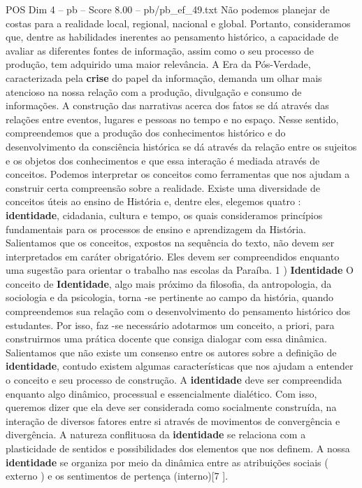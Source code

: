 \begin{textsample}{POS Dim 4 – pb – Score 8.00 – pb/pb\_ef\_49.txt}
Não podemos planejar de costas para a realidade local, regional, nacional e global.
Portanto, consideramos que, dentre as habilidades inerentes ao pensamento histórico, a capacidade de avaliar as diferentes fontes de informação, assim como o seu processo de produção, tem adquirido uma maior relevância.
A Era da Pós-Verdade, caracterizada pela \textbf{crise} do papel da informação, demanda um olhar mais atencioso na nossa relação com a produção, divulgação e consumo de informações.
A construção das narrativas acerca dos fatos se dá através das relações entre eventos, lugares e pessoas no tempo e no espaço.
Nesse sentido, compreendemos que a produção dos conhecimentos histórico e do desenvolvimento da consciência histórica se dá através da relação entre os sujeitos e os objetos dos conhecimentos e que essa interação é mediada através de conceitos.
Podemos interpretar os conceitos como ferramentas que nos ajudam a construir certa compreensão sobre a realidade.
Existe uma diversidade de conceitos úteis ao ensino de História e, dentre eles, elegemos quatro : \textbf{identidade}, cidadania, cultura e tempo, os quais consideramos princípios fundamentais para os processos de ensino e aprendizagem da História.
Salientamos que os conceitos, expostos na sequência do texto, não devem ser interpretados em caráter obrigatório.
Eles devem ser compreendidos enquanto uma sugestão para orientar o trabalho nas escolas da Paraíba. 1 ) \textbf{Identidade} O conceito de \textbf{Identidade}, algo mais próximo da filosofia, da antropologia, da sociologia e da psicologia, torna -se pertinente ao campo da história, quando compreendemos sua relação com o desenvolvimento do pensamento histórico dos estudantes.
Por isso, faz -se necessário adotarmos um conceito, a priori, para construirmos uma prática docente que consiga dialogar com essa dinâmica.
Salientamos que não existe um consenso entre os autores sobre a definição de \textbf{identidade}, contudo existem algumas características que nos ajudam a entender o conceito e seu processo de construção.
A \textbf{identidade} deve ser compreendida enquanto algo dinâmico, processual e essencialmente dialético.
Com isso, queremos dizer que ela deve ser considerada como socialmente construída, na interação de diversos fatores entre si através de movimentos de convergência e divergência.
A natureza conflituosa da \textbf{identidade} se relaciona com a plasticidade de sentidos e possibilidades dos elementos que nos definem.
A nossa \textbf{identidade} se organiza por meio da dinâmica entre as atribuições sociais ( externo ) e os sentimentos de pertença (interno)[7 ].

\end{textsample}
